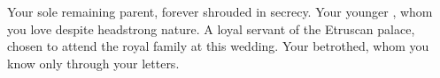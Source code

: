 \documentclass[char]{Kos}
\begin{document}
\begin{contacts}
\contact{\cEtruriaKing{}} Your sole remaining parent, forever shrouded in secrecy.
\contact{\cPoet{}} Your younger \cPoet{\sibling}, whom you love despite \cPoet{\their} headstrong nature.
\contact{\cAssassin{}} A loyal servant of the Etruscan palace, chosen to attend the royal family at this wedding.
\contact{\cBride{}} Your betrothed, whom you know only through your letters.
\end{contacts} 
\end{document}
